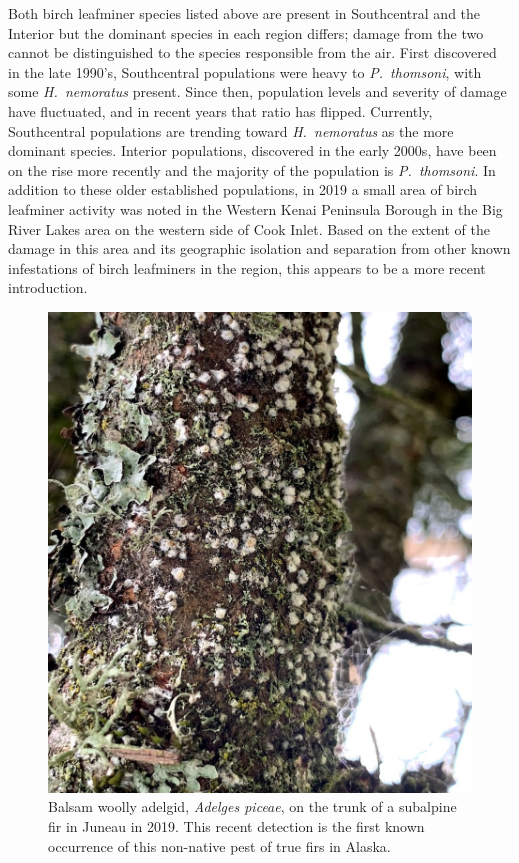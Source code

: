 Both birch leafminer species listed above are present in Southcentral and the Interior but the dominant species in each region differs; damage from the two cannot be distinguished to the species responsible from the air. First discovered in the late 1990’s, Southcentral populations were heavy to \textit{P.\ thomsoni}, with some \textit{H.\ nemoratus} present. Since then, population levels and severity of damage have fluctuated, and in recent years that ratio has flipped. Currently, Southcentral populations are trending toward \textit{H.\ nemoratus} as the more dominant species. Interior populations, discovered in the early 2000s, have been on the rise more recently and the majority of the population is \textit{P.\ thomsoni}. In addition to these older established populations, in 2019 a small area of birch leafminer activity was noted in the Western Kenai Peninsula Borough in the Big River Lakes area on the western side of Cook Inlet. Based on the extent of the damage in this area and its geographic isolation and separation from other known infestations of birch leafminers in the region, this appears to be a more recent introduction.

\begin{figure}[H]
\begin{center}
\includegraphics[width=\textwidth]{img/balsam_woolly_adelgid_on_trunk.jpg}
\caption{Balsam woolly adelgid, \textit{Adelges piceae}, on the trunk of a subalpine fir in Juneau in 2019. This recent detection is the first known occurrence of this non-native pest of true firs in Alaska.}
\label{balsam_woolly_adelgid_on_trunk}
\end{center}
\end{figure} 

